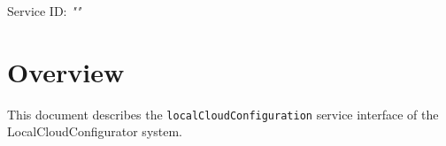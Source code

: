 \documentclass[a4paper]{arrowhead}
\begin{document}
\sloppy

\ArrowheadSetup

\begin{center}
  \vspace*{1cm}
  \huge{\arrowtitle}

  \vspace*{0.2cm}
  \LARGE{\arrowtype}
  \vspace*{1cm}

  \Large{Service ID: \textit{"\arrowid"}}

  \vspace*{\fill}


  \vspace*{1cm}
  \vspace*{\fill}

  \begin{abstract}
    This document describes the HTTP/TLS/JSON interface of the \texttt{local\allowbreak{}Cloud\allowbreak{}Configuration} service, version 1.0.0, of the LocalCloudConfigurator support system of Arrowhead 5.2.2.
  \end{abstract}

  \vspace*{1cm}
\end{center}

\newpage

\tableofcontents
\newpage

\section{Overview}
\label{sec:overview}

This document describes the \texttt{local\allowbreak{}Cloud\allowbreak{}Configuration} service interface of the LocalCloudConfigurator system.
\end{document}
